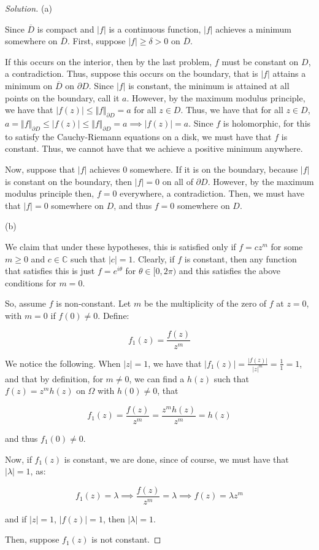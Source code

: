 \documentclass[10pt]{article}
\begin{document}
\begin{proof}[Solution]

(a)

Since $\overline{D}$ is compact and $|f|$ is a continuous function, $|f|$ achieves a minimum somewhere on $\overline{D}$. First, suppose $|f| \geq \delta > 0$ on $\overline{D}$.

If this occurs on the interior, then by the last problem, $f$ must be constant on $D$, a contradiction. Thus, suppose this occurs on the boundary, that is $|f|$ attains a minimum on $\overline{D}$ on $\partial D$. Since $|f|$ is constant, the minimum is attained at all points on the boundary, call it $a$. However, by the maximum modulus principle, we have that $|f(z)| \leq \Vert f \Vert_{\partial D} = a$ for all $z \in D$. Thus, we have that for all $z \in D$, $a = \Vert f \Vert_{\partial D} \leq |f(z)| \leq \Vert f \Vert_{\partial D} = a \implies |f(z)| = a$. Since $f$ is holomorphic, for this to satisfy the Cauchy-Riemann equations on a disk, we must have that $f$ is constant. Thus, we cannot have that we achieve a positive minimum anywhere.

Now, suppose that $|f|$ achieves 0 somewhere. If it is on the boundary, because $|f|$ is constant on the boundary, then $|f| = 0$ on all of $\partial D$. However, by the maximum modulus principle then, $f = 0$ everywhere, a contradiction. Then, we must have that $|f| = 0$ somewhere on $D$, and thus $f = 0$ somewhere on $D$.

(b)

We claim that under these hypotheses, this is satisfied only if $f = cz^m$ for some $m \geq 0$ and $c \in \mathbb{C}$ such that $|c| = 1$. Clearly, if $f$ is constant, then any function that satisfies this is just $f = e^{i \theta}$ for $\theta \in [0,2\pi)$ and this satisfies the above conditions for $m = 0$. 

So, assume $f$ is non-constant. Let $m$ be the multiplicity of the zero of $f$ at $z = 0$, with $m = 0$ if $f(0) \not = 0$. Define:

$$f_1(z) = \frac{f(z)}{z^m}$$

We notice the following. When $|z| = 1$, we have that $|f_1(z)| = \frac{|f(z)|}{|z|^m} = \frac{1}{1} = 1$, and that by definition, for $m \not = 0$, we can find a $h(z)$ such that $f(z) = z^m h(z)$ on $\Omega$ with $h(0) \not = 0$, that

$$f_1(z) = \frac{f(z)}{z^m} = \frac{z^m h(z)}{z^m} = h(z)$$

and thus $f_1(0) \not = 0$.

Now, if $f_1(z)$ is constant, we are done, since of course, we must have that $|\lambda| = 1$, as:

$$f_1(z) = \lambda \implies \frac{f(z)}{z^m} = \lambda \implies f(z) = \lambda z^m$$

and if $|z| = 1$, $|f(z)| = 1$, then $|\lambda| = 1$.

Then, suppose $f_1(z)$ is not constant.



\end{proof}
\end{document}
